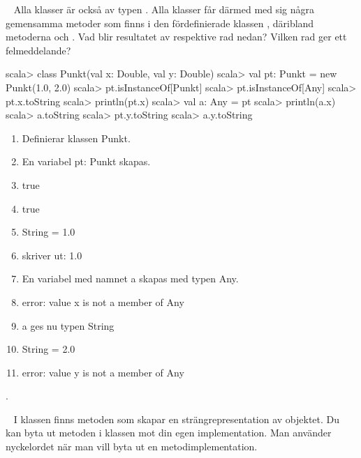 




\QUESTBEGIN

\Task  \what~ Alla klasser är också av typen . Alla klasser får därmed med sig några gemensamma metoder som finns i den fördefinierade klassen , däribland metoderna   och .  Vad blir resultatet av respektive rad nedan? Vilken rad ger ett felmeddelande?


\begin{REPL}
scala> class Punkt(val x: Double, val y: Double)
scala> val pt: Punkt = new Punkt(1.0, 2.0)
scala> pt.isInstanceOf[Punkt]
scala> pt.isInstanceOf[Any]
scala> pt.x.toString
scala> println(pt.x)
scala> val a: Any = pt
scala> println(a.x)
scala> a.toString
scala> pt.y.toString
scala> a.y.toString
\end{REPL}

\SOLUTION


\TaskSolved \what

\begin{enumerate}
\item Definierar klassen Punkt.
\item En variabel pt: Punkt skapas.
\item true
\item true
\item String = 1.0
\item skriver ut: 1.0
\item En variabel med namnet a skapas med typen Any.
\item error: value x is not a member of Any
\item a ges nu typen String
\item String = 2.0
\item error: value y is not a member of Any
\end{enumerate}


\QUESTEND








.

\QUESTBEGIN

\Task  \what~ I klassen  finns metoden  som skapar en strängrepresentation av objektet. Du kan byta ut metoden  i klassen  mot din egen implementation. Man använder nyckelordet  när man vill byta ut en metodimplementation.

